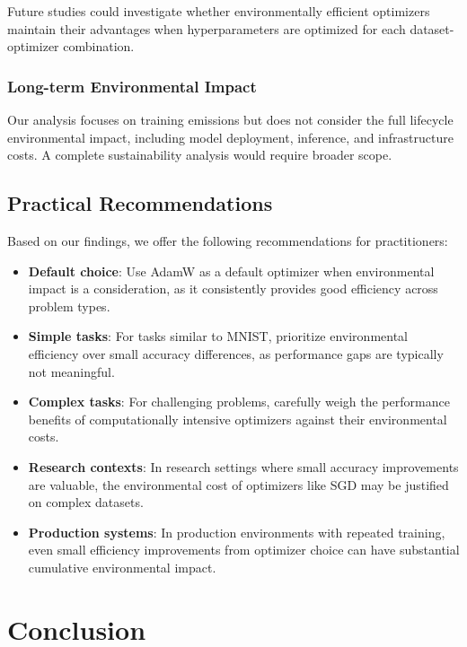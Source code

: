 \documentclass[conference]{IEEEtran}
\begin{document}
Future studies could investigate whether environmentally efficient optimizers maintain their advantages when hyperparameters are optimized for each dataset-optimizer combination.

\subsubsection{Long-term Environmental Impact}

Our analysis focuses on training emissions but does not consider the full lifecycle environmental impact, including model deployment, inference, and infrastructure costs. A complete sustainability analysis would require broader scope.

\subsection{Practical Recommendations}

Based on our findings, we offer the following recommendations for practitioners:

\begin{itemize}
    \item \textbf{Default choice}: Use AdamW as a default optimizer when environmental impact is a consideration, as it consistently provides good efficiency across problem types.
    
    \item \textbf{Simple tasks}: For tasks similar to MNIST, prioritize environmental efficiency over small accuracy differences, as performance gaps are typically not meaningful.
    
    \item \textbf{Complex tasks}: For challenging problems, carefully weigh the performance benefits of computationally intensive optimizers against their environmental costs.
    
    \item \textbf{Research contexts}: In research settings where small accuracy improvements are valuable, the environmental cost of optimizers like SGD may be justified on complex datasets.
    
    \item \textbf{Production systems}: In production environments with repeated training, even small efficiency improvements from optimizer choice can have substantial cumulative environmental impact.
\end{itemize}

\section{Conclusion}
\end{document}

